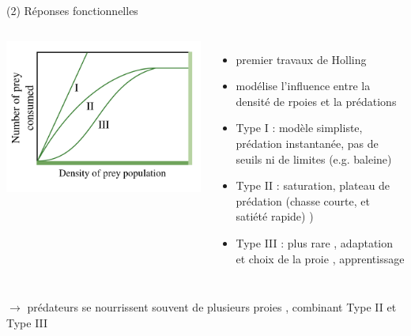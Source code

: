 \documentclass[11,aspectratio=1610]{beamer}
\begin{document}
\begin{frame}{(2) Réponses fonctionnelles}
\begin{scriptsize}

 \begin{columns}
             \centering
             \colorbox{white}{\includegraphics[width=\textwidth]{img/FunctionalResponses.png}}

\begin{itemize}
  \item premier travaux de Holling ~ 
  \item modélise l'influence entre la densité de rpoies et la prédations 
  \item Type I : modèle simpliste, prédation instantanée, pas de seuils ni de limites (e.g. baleine)  
  \item Type II : saturation, plateau de prédation (chasse courte, et satiété rapide) )
  \item Type III : plus rare , adaptation et choix de la proie , apprentissage
\end{itemize}
\end{columns}

\vspace{1cm}

$\rightarrow$ prédateurs se nourrissent souvent de plusieurs proies , combinant Type II et  Type III 
\end{scriptsize}
\end{frame}
\end{document}
